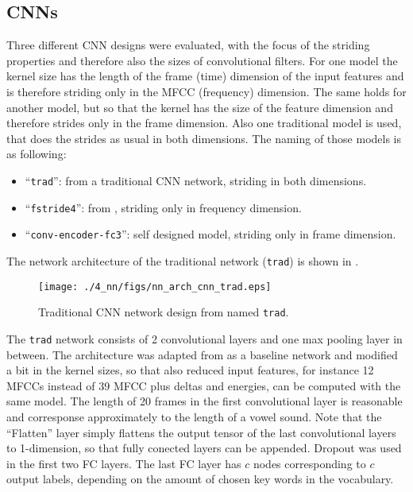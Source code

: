 \subsection{CNNs}\label{sec:nn_arch_cnn}
Three different CNN designs were evaluated, with the focus of the striding properties and therefore also the sizes of convolutional filters.
For one model the kernel size has the length of the frame (time) dimension of the input features and is therefore striding only in the MFCC (frequency) dimension.
The same holds for another model, but so that the kernel has the size of the feature dimension and therefore strides only in the frame dimension.
Also one traditional model is used, that does the strides as usual in both dimensions.
The naming of those models is as following:
\begin{itemize}
	\item \enquote{\texttt{trad}}: from \cite{Sainath2015} a traditional CNN network, striding in both dimensions.
	\item \enquote{\texttt{fstride4}}: from \cite{Sainath2015}, striding only in frequency dimension.
	\item \enquote{\texttt{conv-encoder-fc3}}: self designed model, striding only in frame dimension.
\end{itemize}
The network architecture of the traditional network (\texttt{trad}) is shown in .
\begin{figure}[!ht]
  \centering
    \texttt{[image: ./4\_nn/figs/nn\_arch\_cnn\_trad.eps]}
  \caption{Traditional CNN network design from \cite{Sainath2015} named \texttt{trad}.}
  \label{fig:nn_arch_cnn_trad}
\end{figure}
\FloatBarrier
\noindent
The \texttt{trad} network consists of 2 convolutional layers and one max pooling layer in between.
The architecture was adapted from \cite{Sainath2015} as a baseline network and modified a bit in the kernel sizes, so that also reduced input features, for instance 12 MFCCs instead of 39 MFCC plus deltas and energies, can be computed with the same model.
The length of 20 frames in the first convolutional layer is reasonable and corresponse approximately to the length of a vowel sound.
Note that the \enquote{Flatten} layer simply flattens the output tensor of the last convolutional layers to 1-dimension, so that fully conected layers can be appended.
Dropout was used in the first two FC layers.
The last FC layer has $c$ nodes corresponding to $c$ output labels, depending on the amount of chosen key words in the vocabulary.

